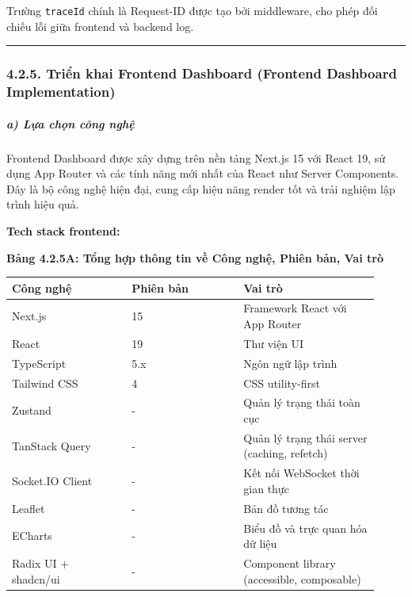 \documentclass[13pt,a4paper]{extarticle}
\newcounter{none} %
\newcommand{\thesislongtableorignewline}{}
\let\thesislongtableorignewline\\
\renewcommand{\\}{\thesislongtableorignewline\hline}%
\let\\\thesislongtableorignewline
\newcommand{\thesistabletitle}[1]{%
  \begin{center}\textbf{#1}\end{center}%
}
\begin{document}
Trường \texttt{traceId} chính là Request-ID được tạo bởi middleware, cho
phép đối chiếu lỗi giữa frontend và backend log.

\begin{center}\rule{0.5\linewidth}{0.5pt}\end{center}

\subsubsection{4.2.5. Triển khai Frontend Dashboard (Frontend Dashboard
Implementation)}\label{425-triux1ec3n-khai-frontend-dashboard-frontend-dashboard-implementation}

\subparagraph{a) Lựa chọn công
nghệ}\label{a-lux1ef1a-chux1ecdn-cuxf4ng-nghux1ec7-2}

Frontend Dashboard được xây dựng trên nền tảng Next.js 15 với React 19,
sử dụng App Router và các tính năng mới nhất của React như Server
Components. Đây là bộ công nghệ hiện đại, cung cấp hiệu năng render tốt
và trải nghiệm lập trình hiệu quả.

\textbf{Tech stack frontend:}

{\def\LTcaptype{none} %
\thesistabletitle{Bảng 4.2.5A: Tổng hợp thông tin về Công nghệ, Phiên bản, Vai trò}

\begin{longtable}{|p{0.30\linewidth}|p{0.28\linewidth}|p{0.34\linewidth}|}
\hline \textbf{Công nghệ} & \textbf{Phiên bản} & \textbf{Vai trò} \\
\hline
\endhead
\hline
\endlastfoot
Next.js & 15 & Framework React với App Router \\
React & 19 & Thư viện UI \\
TypeScript & 5.x & Ngôn ngữ lập trình \\
Tailwind CSS & 4 & CSS utility-first \\
Zustand & - & Quản lý trạng thái toàn cục \\
TanStack Query & - & Quản lý trạng thái server (caching, refetch) \\
Socket.IO Client & - & Kết nối WebSocket thời gian thực \\
Leaflet & - & Bản đồ tương tác \\
ECharts & - & Biểu đồ và trực quan hóa dữ liệu \\
Radix UI + shadcn/ui & - & Component library (accessible, composable) \\
\end{longtable}
}
\end{document}
